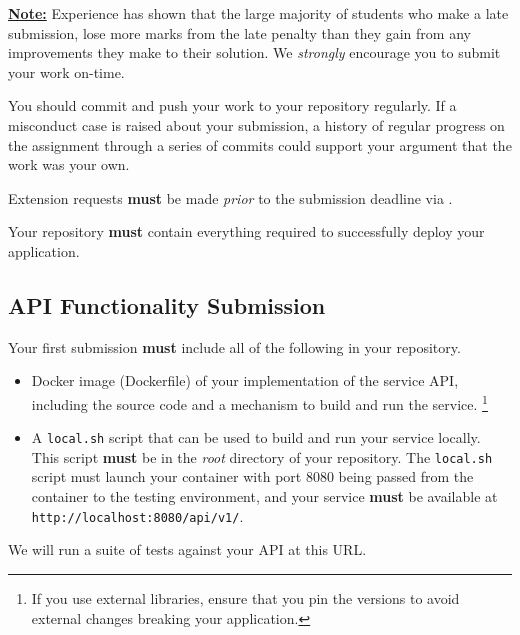 \documentclass{csse4400}
\begin{document}
\textbf{\underline{Note:}} Experience has shown that the large majority of students who make a late submission,
lose more marks from the late penalty than they gain from any improvements they make to their solution.
We \textit{strongly} encourage you to submit your work on-time.

You should commit and push your work to your repository regularly.
If a misconduct case is raised about your submission,
a history of regular progress on the assignment through a series of commits
could support your argument that the work was your own.

Extension requests \textbf{must} be made \emph{prior} to the submission deadline via .

Your repository \textbf{must} contain everything required to successfully deploy your application.

\subsection{API Functionality Submission}
Your first submission \textbf{must} include all of the following in your repository.
\begin{itemize}
  \item Docker image (Dockerfile) of your implementation of the service API,
        including the source code and a mechanism to build and run the service.%
        \footnote{If you use external libraries,
                  ensure that you pin the versions to avoid external changes breaking your application.}
  \item A \texttt{local.sh} script that can be used to build and run your service locally.
        This script \textbf{must} be in the \emph{root} directory of your repository.
        The \texttt{local.sh} script must launch your container with port 8080 being passed from the container
        to the testing environment, and your service \textbf{must} be available at \texttt{http://localhost:8080/api/v1/}.
\end{itemize}
We will run a suite of tests against your API at this URL.
\end{document}
